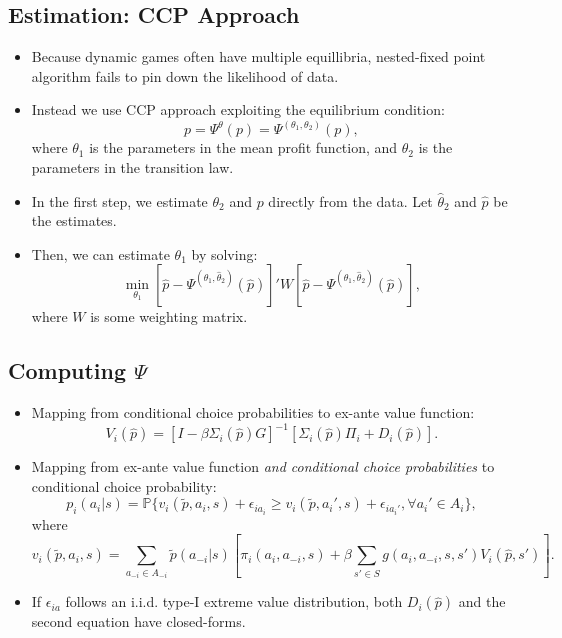 \documentclass[
]{book}
\providecommand{\tightlist}{%
  \setlength{\itemsep}{0pt}\setlength{\parskip}{0pt}}
\begin{document}
\hypertarget{estimation-ccp-approach}{%
\subsection{Estimation: CCP Approach}\label{estimation-ccp-approach}}

\begin{itemize}
\tightlist
\item
  Because dynamic games often have multiple equillibria, nested-fixed
  point algorithm fails to pin down the likelihood of data.
\item
  Instead we use CCP approach exploiting the equilibrium condition:
  \begin{equation}
  p = \Psi^\theta(p) = \Psi^{(\theta_1, \theta_2)}(p),
  \end{equation} where \(\theta_1\) is the parameters in the mean profit
  function, and \(\theta_2\) is the parameters in the transition law.
\item
  In the first step, we estimate \(\theta_2\) and \(p\) directly from the
  data. Let \(\hat{\theta}_2\) and \(\hat{p}\) be the estimates.
\item
  Then, we can estimate \(\theta_1\) by solving: \begin{equation}
  \min_{\theta_1} [\hat{p} - \Psi^{(\theta_1, \hat{\theta}_2)}(\hat{p})]' W [\hat{p} - \Psi^{(\theta_1, \hat{\theta}_2)}(\hat{p})],
  \end{equation} where \(W\) is some weighting matrix.
\end{itemize}

\hypertarget{computing-psi}{%
\subsection{\texorpdfstring{Computing \(\Psi\)}{Computing \textbackslash Psi}}\label{computing-psi}}

\begin{itemize}
\item
  Mapping from conditional choice probabilities to ex-ante value
  function: \[
  V_i(\hat{p}) = [I - \beta \Sigma_i(\hat{p})G]^{-1} [\Sigma_i(\hat{p})\Pi_i + D_i(\hat{p})].
  \]
\item
  Mapping from ex-ante value function
  \textit{and conditional choice probabilities} to conditional choice
  probability: \begin{equation}
  p_i(a_i|s) =  \mathbb{P}\{v_i(\tilde{p}, a_i, s) + \epsilon_{ia_i} \ge  v_i(\tilde{p}, a_i', s) + \epsilon_{ia_i'}, \forall a_i' \in A_i\},
  \end{equation} where \begin{equation}
  v_i(\tilde{p}, a_i, s) = \sum_{a_{-i} \in A_{-i}} \tilde{p}(a_{-i}|s) [\pi_i(a_i, a_{-i}, s) + \beta \sum_{s' \in S} g(a_i, a_{-i}, s, s') V_i(\hat{p}, s')].
  \end{equation}
\item
  If \(\epsilon_{ia}\) follows an i.i.d. type-I extreme value
  distribution, both \(D_i(\hat{p})\) and the second equation have
  closed-forms.
\end{itemize}
\end{document}
